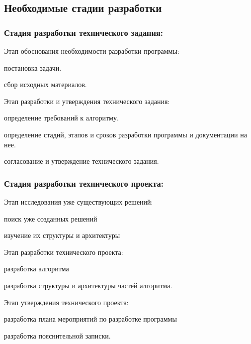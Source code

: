 
\subsection{Необходимые стадии разработки}

\subsubsection{Стадия разработки технического задания:}
\begin{my_enumerate}
\item Этап обоснования необходимости разработки программы:
    \begin{my_enumerate}
    \item постановка задачи.
    \item сбор исходных материалов.
    \end{my_enumerate}
\item Этап разработки и утверждения технического задания:
    \begin{my_enumerate}
    \item определение требований к алгоритму.
    \item определение стадий, этапов и сроков разработки программы и документации на нее.
    \item согласование и утверждение технического задания.
    \end{my_enumerate}
\end{my_enumerate}

\subsubsection{Стадия разработки технического проекта:}
\begin{my_enumerate}
\item Этап исследования уже существующих решений:
    \begin{my_enumerate}
    \item поиск уже созданных решений
    \item изучение их структуры и архитектуры
    \end{my_enumerate}
\item Этап разработки технического проекта:
    \begin{my_enumerate}
    \item разработка алгоритма
    \item разработка структуры и архитектуры частей алгоритма.
    \end{my_enumerate}
\item Этап утверждения технического проекта:
    \begin{my_enumerate}
    \item разработка плана мероприятий по разработке программы
    \item разработка пояснительной записки.
    \end{my_enumerate}
\end{my_enumerate}


